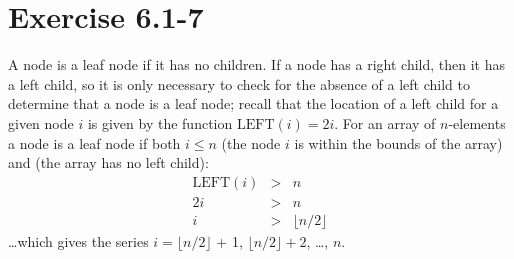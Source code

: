\documentclass{article}
\begin{document}
\section*{Exercise 6.1-7}

A node is a leaf node if it has no children. If a node has a right child, then it has a left child, so it is only necessary to check for the absence of a left child to determine that a node is a leaf node; recall that the location of a left child for a given node $i$ is given by the function $\text{LEFT}(i) = 2i$. For an array of $n$-elements a node is a leaf node if both $i \leq n$ (the node $i$ is within the bounds of the array) and (the array has no left child):
\begin{eqnarray*}
	\text{LEFT}(i) & > & n \\
	2i & > & n \\
	i & > & \lfloor n / 2 \rfloor
\end{eqnarray*}
\ldots which gives the series $i = \lfloor n / 2 \rfloor$ + 1, $\lfloor n / 2 \rfloor + 2$, \ldots, $n$.
\end{document}
